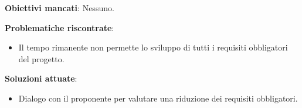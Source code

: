 \textbf{Obiettivi mancati}: Nessuno.

\textbf{Problematiche riscontrate}:
\begin{itemize}
	\item Il tempo rimanente non permette lo sviluppo di tutti i requisiti obbligatori del progetto.
\end{itemize}

\textbf{Soluzioni attuate}: \begin{itemize}
	\item Dialogo con il proponente per valutare una riduzione dei requisiti obbligatori.
\end{itemize}